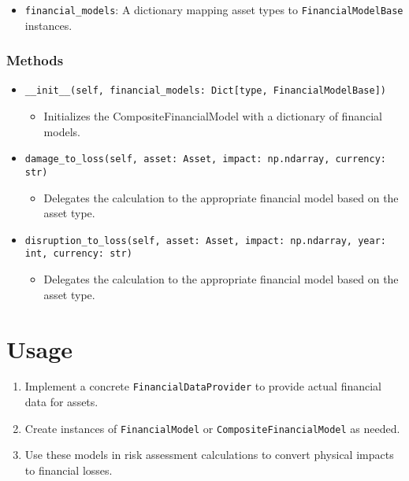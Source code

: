 \documentclass{article}
\begin{document}
\begin{itemize}
    \item \texttt{financial\_models}: A dictionary mapping asset types to \texttt{FinancialModelBase} instances.
\end{itemize}

\subsubsection{Methods}

\begin{itemize}
    \item \texttt{\_\_init\_\_(self, financial\_models: Dict[type, FinancialModelBase])}
    \begin{itemize}
        \item Initializes the CompositeFinancialModel with a dictionary of financial models.
    \end{itemize}

    \item \texttt{damage\_to\_loss(self, asset: Asset, impact: np.ndarray, currency: str)}
    \begin{itemize}
        \item Delegates the calculation to the appropriate financial model based on the asset type.
    \end{itemize}

    \item \texttt{disruption\_to\_loss(self, asset: Asset, impact: np.ndarray, year: int, currency: str)}
    \begin{itemize}
        \item Delegates the calculation to the appropriate financial model based on the asset type.
    \end{itemize}
\end{itemize}

\section{Usage}

\begin{enumerate}
    \item Implement a concrete \texttt{FinancialDataProvider} to provide actual financial data for assets.
    \item Create instances of \texttt{FinancialModel} or \texttt{CompositeFinancialModel} as needed.
    \item Use these models in risk assessment calculations to convert physical impacts to financial losses.
\end{enumerate}
\end{document}
